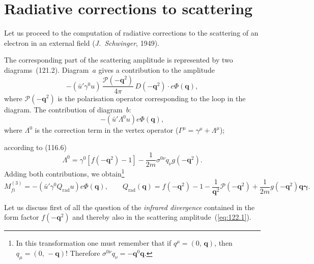 
\section{Radiative corrections to scattering}


Let us proceed to the computation of radiative corrections to the scattering of an electron in an external field (\emph{J.~Schwinger}, 1949).

The corresponding part of the scattering amplitude is represented by two diagrams~(121.2). Diagram~$a$ gives a contribution to the amplitude
\[
-(\bar{u}'\gamma^0 u)\,\frac{\mathcal{P}(-\mathbf{q}^2)}{4\pi}\,D(-\mathbf{q}^2)\cdot e\Phi(\mathbf{q}),
\]
where $\mathcal{P}(-\mathbf{q}^2)$ is the polarisation operator corresponding to the loop in the diagram. The contribution of diagram~$b$:
\[
-(\bar{u}'\Lambda^0 u)e\Phi(\mathbf{q}),
\]
where $\Lambda^0$ is the correction term in the vertex operator ($\Gamma^\mu = \gamma^\mu + \Lambda^\mu$);


\noindent according to (116.6)
\[
\Lambda^0 = \gamma^0[f(-\mathbf{q}^2)-1] - \frac{1}{2m}\sigma^{0\nu}q_\nu g(-\mathbf{q}^2).
\]
Adding both contributions, we obtain\footnote{In this transformation one must remember that if $q^\mu = (0,\,\mathbf{q})$, then $q_\mu = (0,\,-\mathbf{q})$! Therefore $\sigma^{0\nu}q_\nu = -\mathbf{q}^0\mathbf{q}$.}
\begin{equation}
M_{fi}^{(3)} = -(\bar{u}'\gamma^0 Q_{\text{rad}} u)e\Phi(\mathbf{q}),\qquad
Q_{\text{rad}}(\mathbf{q}) = f(-\mathbf{q}^2) - 1 - \frac{1}{\mathbf{q}^2}\mathcal{P}(-\mathbf{q}^2) + \frac{1}{2m}g(-\mathbf{q}^2)\mathbf{q}\boldsymbol{\gamma}.
\label{eq:122.1}
\end{equation}

Let us discuss first of all the question of the \emph{infrared divergence} contained in the form factor $f(-\mathbf{q}^2)$ and thereby also in the scattering amplitude~(\ref{eq:122.1}).


